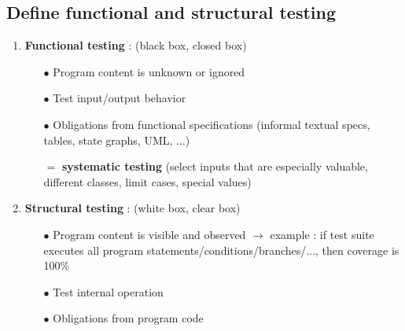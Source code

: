 \documentclass{article}
\begin{document}
\subsection{Define functional and structural testing}
\vspace{-0.5cm}
\begin{multicols}{2}
\begin{enumerate}
    \item \textbf{Functional testing} : (black box, closed box)
    \begin{itemize}
        \item [$\bullet$]Program content is unknown or ignored
        \item [$\bullet$]Test input/output behavior
        \item [$\bullet$]Obligations from functional specifications (informal textual specs, tables, state graphs, UML, ...)
        \item [$=$] \textbf{systematic testing} (select inputs that are especially valuable, different classes, limit cases, special values)
    \end{itemize}
    \vfill\null\columnbreak
    \item \textbf{Structural testing} : (white box, clear box)
    \begin{itemize}
         \item [$\bullet$]Program content is visible and observed $\rightarrow$ example : if test suite executes all program statements/conditions/branches/..., then coverage is 100\%
         \item [$\bullet$]Test internal operation
         \item [$\bullet$]Obligations from program code
     \end{itemize}
 \vfill\null
\end{enumerate}
\end{multicols}

\newpage
\end{document}
